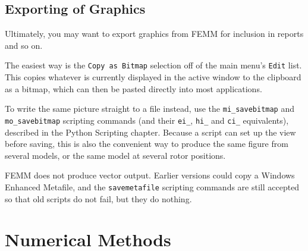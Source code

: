 \documentclass[12pt]{report}
\begin{document}






\section{Exporting of Graphics}

Ultimately, you may want to export graphics from FEMM for inclusion
in reports and so on.

The easiest way is the {\tt Copy as Bitmap} selection off of the main
menu's {\tt Edit} list.  This copies whatever is currently displayed in the
active window to the clipboard as a bitmap, which can then be pasted
directly into most applications.

To write the same picture straight to a file instead, use the
{\tt mi\_savebitmap} and {\tt mo\_savebitmap} scripting commands (and their
{\tt ei\_}, {\tt hi\_} and {\tt ci\_} equivalents), described in the
Python Scripting chapter.  Because a script can set up the view before
saving, this is also the convenient way to produce the same figure from
several models, or the same model at several rotor positions.

FEMM does not produce vector output.  Earlier versions could copy a Windows
Enhanced Metafile, and the {\tt savemetafile} scripting commands are still
accepted so that old scripts do not fail, but they do nothing.

%
%

















\chapter{Numerical Methods}  \label{fkern_stuff}
\end{document}

